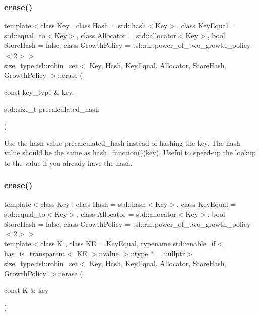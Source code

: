 \subsubsection{\texorpdfstring{erase()}{erase()}\hspace{0.1cm}{\footnotesize\ttfamily [1/3]}}
{\footnotesize\ttfamily template$<$class Key , class Hash  = std\+::hash$<$\+Key$>$, class Key\+Equal  = std\+::equal\+\_\+to$<$\+Key$>$, class Allocator  = std\+::allocator$<$\+Key$>$, bool Store\+Hash = false, class Growth\+Policy  = tsl\+::rh\+::power\+\_\+of\+\_\+two\+\_\+growth\+\_\+policy$<$2$>$$>$ \\
size\+\_\+type \mbox{\hyperlink{classtsl_1_1robin__set}{tsl\+::robin\+\_\+set}}$<$ Key, Hash, Key\+Equal, Allocator, Store\+Hash, Growth\+Policy $>$\+::erase (\begin{DoxyParamCaption}\item[{const key\+\_\+type \&}]{key,  }\item[{std\+::size\+\_\+t}]{precalculated\+\_\+hash }\end{DoxyParamCaption})\hspace{0.3cm}{\ttfamily [inline]}}

Use the hash value \textquotesingle{}precalculated\+\_\+hash\textquotesingle{} instead of hashing the key. The hash value should be the same as hash\+\_\+function()(key). Useful to speed-\/up the lookup to the value if you already have the hash. \mbox{\label{classtsl_1_1robin__set_a73ab9452fa9af3e897603dcb8df86648}} 
\subsubsection{\texorpdfstring{erase()}{erase()}\hspace{0.1cm}{\footnotesize\ttfamily [2/3]}}
{\footnotesize\ttfamily template$<$class Key , class Hash  = std\+::hash$<$\+Key$>$, class Key\+Equal  = std\+::equal\+\_\+to$<$\+Key$>$, class Allocator  = std\+::allocator$<$\+Key$>$, bool Store\+Hash = false, class Growth\+Policy  = tsl\+::rh\+::power\+\_\+of\+\_\+two\+\_\+growth\+\_\+policy$<$2$>$$>$ \\
template$<$class K , class KE  = Key\+Equal, typename std\+::enable\+\_\+if$<$ has\+\_\+is\+\_\+transparent$<$ K\+E $>$\+::value $>$\+::type $\ast$  = nullptr$>$ \\
size\+\_\+type \mbox{\hyperlink{classtsl_1_1robin__set}{tsl\+::robin\+\_\+set}}$<$ Key, Hash, Key\+Equal, Allocator, Store\+Hash, Growth\+Policy $>$\+::erase (\begin{DoxyParamCaption}\item[{const K \&}]{key }\end{DoxyParamCaption})\hspace{0.3cm}{\ttfamily [inline]}}

